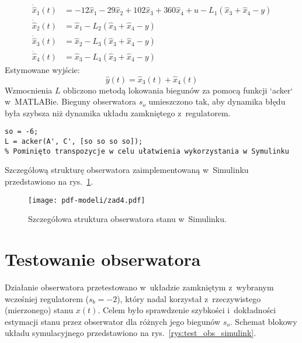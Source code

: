 \documentclass[a4paper,titlepage,11pt,floatssmall]{mwrep} %
\begin{document}
\begin{align}
    \dot{\hat{x}}_1(t) &= -12\hat{x}_1 - 29\hat{x}_2 + 102\hat{x}_3 + 360\hat{x}_4 + u - L_1(\hat{x}_3 + \hat{x}_4 - y) \nonumber \\
    \dot{\hat{x}}_2(t) &= \hat{x}_1 - L_2(\hat{x}_3 + \hat{x}_4 - y) \nonumber \\
    \dot{\hat{x}}_3(t) &= \hat{x}_2 - L_3(\hat{x}_3 + \hat{x}_4 - y) \label{eq:rownania_obserwatora} \\
    \dot{\hat{x}}_4(t) &= \hat{x}_3 - L_4(\hat{x}_3 + \hat{x}_4 - y) \nonumber
\end{align}
Estymowane wyjście:
\begin{equation}
    \hat{y}(t) = \hat{x}_3(t) + \hat{x}_4(t)
\end{equation}
Wzmocnienia $L$ obliczono metodą lokowania biegunów za pomocą funkcji `acker` w~MATLABie. Bieguny obserwatora $s_o$ umieszczono tak, aby dynamika błędu była szybsza niż dynamika układu zamkniętego z~regulatorem. %
\begin{lstlisting}[style=custommatlab, caption={Obliczenie wzmocnień obserwatora L.}, label={lst:acker_L}]
so = -6;
L = acker(A', C', [so so so so]);
% Pominięto transpozycje w celu ułatwienia wykorzystania w Symulinku
\end{lstlisting}
Szczegółową strukturę obserwatora zaimplementowaną w~Simulinku przedstawiono na rys.~\ref{rys:obserwator_simulink}.

\begin{figure}[H]
    \centering
    \texttt{[image: pdf-modeli/zad4.pdf]} %
    \caption{Szczegółowa struktura obserwatora stanu w~Simulinku.}
    \label{rys:obserwator_simulink}
\end{figure}

\FloatBarrier
\section{Testowanie obserwatora}

Działanie obserwatora przetestowano w~układzie zamkniętym z~wybranym wcześniej regulatorem ($s_b = -2$), który nadal korzystał z~rzeczywistego (mierzonego) stanu $x(t)$. Celem było sprawdzenie szybkości i~dokładności estymacji stanu przez obserwator dla różnych jego biegunów $s_o$. Schemat blokowy układu symulacyjnego przedstawiono na rys.~\ref{rys:test_obs_simulink}.
\end{document}
